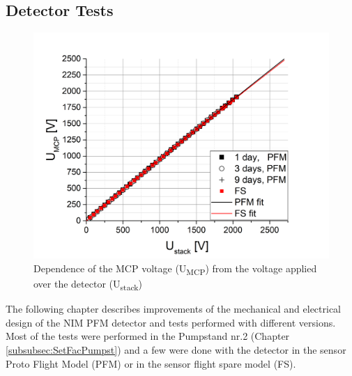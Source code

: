 	\subsection{Detector Tests}
	
	\begin{figure}[h]
		\centering
		\includegraphics[width=.7\textwidth]{Experiments/PFM_UstackUmccp_TimeEvol.png}
		\caption{Dependence of the MCP voltage (U\textsubscript{MCP}) from the voltage applied over the detector (U\textsubscript{stack})}
		\label{fig:PFMUstackUmcpTimeEvol}
	\end{figure}
	
	The following chapter describes improvements of the mechanical and electrical design of the NIM PFM detector and tests performed with different versions. Most of the tests were performed in the Pumpstand nr.2 (Chapter \ref{subsubsec:SetFacPumpst}) and a few were done with the detector in the sensor Proto Flight Model (PFM) or in the sensor flight spare model (FS).\\
	
